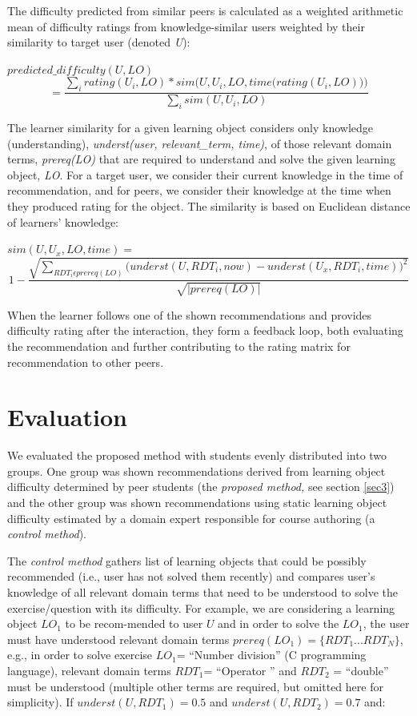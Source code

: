 \documentclass{llncs}
\begin{document}
The difficulty predicted from similar peers is calculated as a weighted arithmetic mean of difficulty ratings from knowledge-similar users weighted by their similarity to target user (denoted \emph{U}):

$predicted\_difficulty (U,LO)$
$$=\frac{\sum_i rating (U_i, LO) * sim \Bigg(U, U_i, LO, time \Big(rating (U_i, LO)\Big)\Bigg)}{\sum_i sim (U, U_i, LO)}$$

The learner similarity for a given learning object considers only knowledge (understanding), \emph{underst(user, relevant\_term, time)}, of those relevant domain terms, \emph{prereq(LO)} that are required to understand and solve the given learning object, \emph{LO}. For a target user, we consider their current knowledge in the time of recommendation, and for peers, we consider their knowledge at the time when they produced rating for the object. The similarity is based on Euclidean distance of learners' knowledge:

$sim(U, U_x, LO, time) =$
$$1-\frac{\sqrt{\sum_{RDT_i\epsilon prereq(LO)}\Big(underst(U, RDT_i, now) - underst(U_x, RDT_i, time)\Big)^2}}{\sqrt{|prereq (LO)|}}$$

When the learner follows one of the shown recommendations and provides difficulty rating after the interaction, they form a feedback loop, both evaluating the recommendation and further contributing to the rating matrix for recommendation to other peers.

\section{Evaluation}
\label{sec4}

We evaluated the proposed method with students evenly distributed into two groups. One group was shown recommendations derived from learning object difficulty determined by peer students (the \emph{proposed method,} see section \ref{sec3}) and the other group was shown recommendations using static learning object difficulty estimated by a domain expert responsible for course authoring (a \emph{control method}).

The \emph{control method} gathers list of learning objects that could be possibly recommended (i.e., user has not solved them recently) and compares user's knowledge of all relevant domain terms that need to be understood to solve the exercise/question with its difficulty. For example, we are considering a learning object $LO_1$ to be recom-mended to user $U$ and in order to solve the $LO_1$, the user must have understood relevant domain terms $prereq(LO_1) = \{RDT_1 ...RDT_N\}$, e.g., in order to solve exercise $LO_1$= ``Number division'' (C programming language), relevant domain terms $RDT_1$= ``Operator \/'' and $RDT_2$ = ``double'' must be understood (multiple other terms are required, but omitted here for simplicity). If $underst(U, RDT_1) = 0.5$ and $underst(U, RDT_2) = 0.7$ and:
\end{document}

